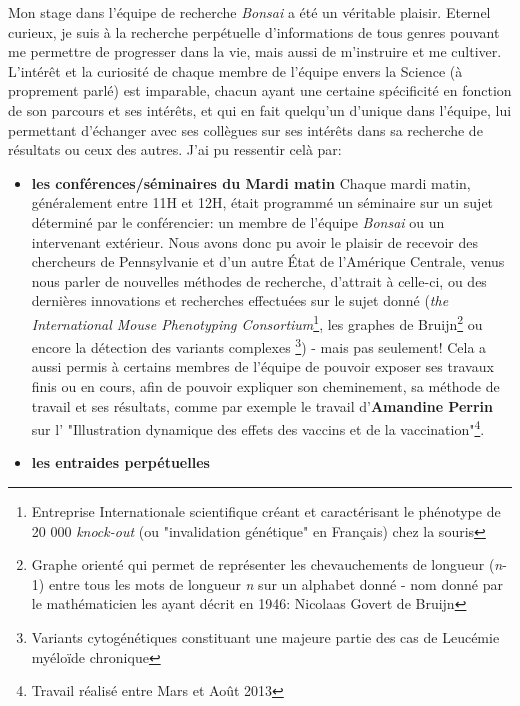 \documentclass[pdftex,12pt,a4paper]{report}
\begin{document}
\begin{spacing}{1.2}
Mon stage dans l'équipe de recherche \textit{Bonsai} a été un véritable plaisir.
\newline
Eternel curieux, je suis à la recherche perpétuelle d'informations de tous genres pouvant me permettre de progresser dans la vie, mais aussi de m'instruire et me cultiver. L'intérêt et la curiosité de chaque membre de l'équipe envers la Science (à proprement parlé) est imparable, chacun ayant une certaine spécificité en fonction de son parcours et ses intérêts, et qui en fait quelqu'un d'unique dans l'équipe, lui permettant d'échanger avec ses collègues sur ses intérêts dans sa recherche de résultats ou ceux des autres.
\newline
J'ai pu ressentir celà par:
\begin{itemize}
\item \textbf{les conférences/séminaires du Mardi matin}
	\newline
	Chaque mardi matin, généralement entre 11H et 12H, était programmé un séminaire sur un sujet déterminé par le conférencier: un membre de l'équipe \textit{Bonsai} ou un intervenant extérieur.
	\newline
	Nous avons donc pu avoir le plaisir de recevoir des chercheurs de Pennsylvanie et d'un autre État de l'Amérique Centrale, venus nous parler de nouvelles méthodes de recherche, d'attrait à celle-ci, ou des dernières innovations et recherches effectuées sur le sujet donné (\textit{the International Mouse Phenotyping Consortium}\footnote{Entreprise Internationale scientifique créant et caractérisant le phénotype de 20 000 \textit{knock-out} (ou "invalidation génétique" en Français) chez la souris}, les graphes de Bruijn\footnote{Graphe orienté qui permet de représenter les chevauchements de longueur (\textit{n}-1) entre tous les mots de longueur \textit{n} sur un alphabet donné - nom donné par le mathématicien les ayant décrit en 1946: Nicolaas Govert de Bruijn} ou encore la détection des variants complexes \footnote{Variants cytogénétiques constituant une majeure partie des cas de Leucémie myéloïde chronique}) -  mais pas seulement!
	\newline
	Cela a aussi permis à certains membres de l'équipe de pouvoir exposer ses travaux finis ou en cours, afin de pouvoir expliquer son cheminement, sa méthode de travail et ses résultats, comme par exemple le travail d'\textbf{Amandine Perrin} sur l' "Illustration dynamique des effets des vaccins et de la vaccination"\footnote{Travail réalisé entre Mars et Août 2013}.
\item \textbf{les entraides perpétuelles}

\end{itemize}
\end{spacing}
\end{document}
